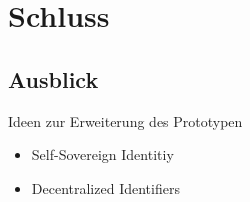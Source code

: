 \section{Schluss}
\subsection{Ausblick}
	Ideen zur Erweiterung des Prototypen
	\begin{itemize}
		\item Self-Sovereign Identitiy
		\item Decentralized Identifiers
	\end{itemize}